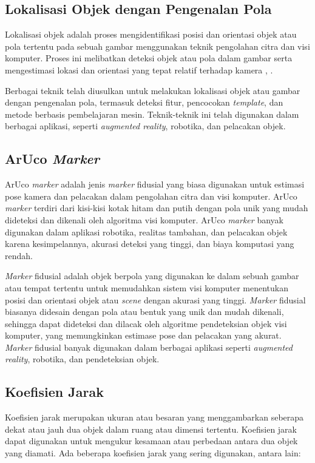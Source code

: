 \subsection{Lokalisasi Objek dengan Pengenalan Pola}
Lokalisasi objek adalah proses mengidentifikasi posisi dan orientasi objek atau pola tertentu pada sebuah gambar menggunakan teknik pengolahan citra dan visi komputer. Proses ini melibatkan deteksi objek atau pola dalam gambar serta mengestimasi lokasi dan orientasi yang tepat relatif terhadap kamera \cite{sivic2003video}, \cite{liu2016ssd}.

Berbagai teknik telah diusulkan untuk melakukan lokalisasi objek atau gambar dengan pengenalan pola, termasuk deteksi fitur, pencocokan \emph{template}, dan metode berbasis pembelajaran mesin. Teknik-teknik ini telah digunakan dalam berbagai aplikasi, seperti \emph{augmented reality}, robotika, dan pelacakan objek.

\subsection{ArUco \emph{Marker}}
ArUco \emph{marker} adalah jenis \emph{marker} fidusial yang biasa digunakan untuk estimasi pose kamera dan pelacakan dalam pengolahan citra dan visi komputer. ArUco \emph{marker} terdiri dari kisi-kisi kotak hitam dan putih dengan pola unik yang mudah dideteksi dan dikenali oleh algoritma visi komputer. ArUco \emph{marker} banyak digunakan dalam aplikasi robotika, realitas tambahan, dan pelacakan objek karena kesimpelannya, akurasi deteksi yang tinggi, dan biaya komputasi yang rendah.

\emph{Marker} fidusial adalah objek berpola yang digunakan ke dalam sebuah gambar atau tempat tertentu untuk memudahkan sistem visi komputer menentukan posisi dan orientasi objek atau \emph{scene} dengan akurasi yang tinggi. \emph{Marker} fidusial biasanya didesain dengan pola atau bentuk yang unik dan mudah dikenali, sehingga dapat dideteksi dan dilacak oleh algoritme pendeteksian objek visi komputer, yang memungkinkan estimase pose dan pelacakan yang akurat. \emph{Marker} fidusial banyak digunakan dalam berbagai aplikasi seperti \emph{augmented reality}, robotika, dan pendeteksian objek.


\subsection{Koefisien Jarak}
Koefisien jarak merupakan ukuran atau besaran yang menggambarkan seberapa dekat atau jauh dua objek dalam ruang atau dimensi tertentu. Koefisien jarak dapat digunakan untuk mengukur kesamaan atau perbedaan antara dua objek yang diamati. Ada beberapa koefisien jarak yang sering digunakan, antara lain:

